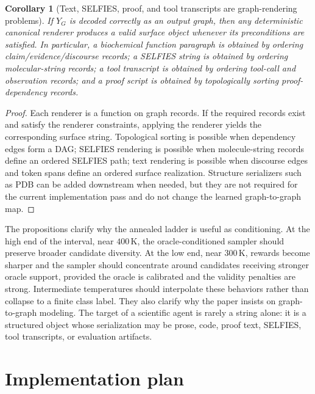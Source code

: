\documentclass[11pt]{article}
\newtheorem{corollary}[definition]{Corollary}
\newcommand{\1}{\mathbf{1}}
\begin{document}
\begin{corollary}[Text, SELFIES, proof, and tool transcripts are graph-rendering problems]
If \(Y_G\) is decoded correctly as an output graph, then any deterministic canonical renderer produces a valid surface object whenever its preconditions are satisfied. In particular, a biochemical function paragraph is obtained by ordering claim/evidence/discourse records; a SELFIES string is obtained by ordering molecular-string records; a tool transcript is obtained by ordering tool-call and observation records; and a proof script is obtained by topologically sorting proof-dependency records.
\end{corollary}
\begin{proof}
Each renderer is a function on graph records. If the required records exist and satisfy the renderer constraints, applying the renderer yields the corresponding surface string. Topological sorting is possible when dependency edges form a DAG; SELFIES rendering is possible when molecule-string records define an ordered SELFIES path; text rendering is possible when discourse edges and token spans define an ordered surface realization. Structure serializers such as PDB can be added downstream when needed, but they are not required for the current implementation pass and do not change the learned graph-to-graph map.
\end{proof}

The propositions clarify why the annealed ladder is useful as conditioning. At the high end of the interval, near \(400\,\mathrm K\), the oracle-conditioned sampler should preserve broader candidate diversity. At the low end, near \(300\,\mathrm K\), rewards become sharper and the sampler should concentrate around candidates receiving stronger oracle support, provided the oracle is calibrated and the validity penalties are strong. Intermediate temperatures should interpolate these behaviors rather than collapse to a finite class label. They also clarify why the paper insists on graph-to-graph modeling. The target of a scientific agent is rarely a string alone: it is a structured object whose serialization may be prose, code, proof text, SELFIES, tool transcripts, or evaluation artifacts.

\section{Implementation plan}
\end{document}
